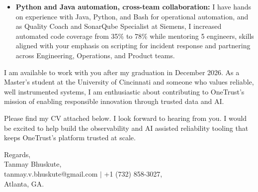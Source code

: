 \documentclass[11pt]{letter}
\begin{document}
\begin{letter}{}
\begin{itemize}[leftmargin=*, itemsep=0.45em]
    \item \textbf{Python and Java automation, cross-team collaboration:} I have hands on experience with Java, Python, and Bash for operational automation, and as Quality Coach and SonarQube Specialist at Siemens, I increased automated code coverage from 35\% to 78\% while mentoring 5 engineers, skills aligned with your emphasis on scripting for incident response and partnering across Engineering, Operations, and Product teams.
\end{itemize}

I am available to work with you after my graduation in December 2026. As a Master's student at the University of Cincinnati and someone who values reliable, well instrumented systems, I am enthusiastic about contributing to OneTrust's mission of enabling responsible innovation through trusted data and AI.

Please find my CV attached below. I look forward to hearing from you. I would be excited to help build the observability and AI assisted reliability tooling that keeps OneTrust's platform trusted at scale.

{\setlength{\parskip}{0pt}
Regards,\\
Tanmay Bhuskute,\\
tanmay.v.bhuskute@gmail.com $\mid$ +1 (732) 858-3027,\\
Atlanta, GA.
}

\end{letter}
\end{document}
